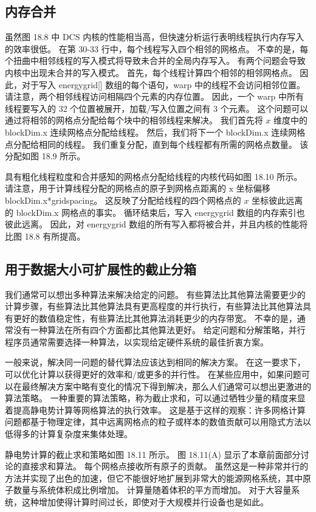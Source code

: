 \subsection{内存合并}
虽然图 18.8 中 DCS 内核的性能相当高，但快速分析运行表明线程执行内存写入的效率很低。 在第 30-33 行中，每个线程写入四个相邻的网格点。 不幸的是，每个扭曲中相邻线程的写入模式将导致未合并的全局内存写入。 有两个问题会导致内核中出现未合并的写入模式。 首先，每个线程计算四个相邻的相邻网格点。 因此，对于写入 energygrid[] 数组的每个语句，warp 中的线程不会访问相邻位置。 请注意，两个相邻线程访问相隔四个元素的内存位置。 因此，一个 warp 中所有线程要写入的 32 个位置被展开，加载/写入位置之间有 3 个元素。 这个问题可以通过将相邻的网格点分配给每个块中的相邻线程来解决。 我们首先将 $x$ 维度中的 blockDim.x 连续网格点分配给线程。 然后，我们将下一个 blockDim.x 连续网格点分配给相同的线程。 我们重复分配，直到每个线程都有所需的网格点数量。 该分配如图 18.9 所示。

具有粗化线程粒度和合并感知的网格点分配给线程的内核代码如图 18.10 所示。 请注意，用于计算线程分配的网格点的原子到网格点距离的 $\mathrm{x}$ 坐标偏移 blockDim.x*gridspacing。 这反映了分配给线程的四个网格点的 $x$ 坐标彼此远离的 blockDim.x 网格点的事实。 循环结束后，写入 energygrid 数组的内存索引也彼此远离。 因此，对 energygrid 数组的所有写入都将被合并，并且内核的性能将比图 18.8 有所提高。

\subsection{用于数据大小可扩展性的截止分箱}
我们通常可以想出多种算法来解决给定的问题。 有些算法比其他算法需要更少的计算步骤，有些算法比其他算法具有更高程度的并行执行，有些算法比其他算法具有更好的数值稳定性，有些算法比其他算法消耗更少的内存带宽。 不幸的是，通常没有一种算法在所有四个方面都比其他算法更好。 给定问题和分解策略，并行程序员通常需要选择一种算法，以实现给定硬件系统的最佳折衷方案。

一般来说，解决同一问题的替代算法应该达到相同的解决方案。 在这一要求下，可以优化计算以获得更好的效率和/或更多的并行性。 在某些应用中，如果问题可以在最终解决方案中略有变化的情况下得到解决，那么人们通常可以想出更激进的算法策略。 一种重要的算法策略，称为截止求和，可以通过牺牲少量的精度来显着提高静电势计算等网格算法的执行效率。 这是基于这样的观察：许多网格计算问题都基于物理定律，其中远离网格点的粒子或样本的数值贡献可以用隐式方法以低得多的计算复杂度来集体处理。

静电势计算的截止求和策略如图 18.11 所示。 图 18.11(A) 显示了本章前面部分讨论的直接求和算法。 每个网格点接收所有原子的贡献。 虽然这是一种非常并行的方法并实现了出色的加速，但它不能很好地扩展到非常大的能源网格系统，其中原子数量与系统体积成比例增加。 计算量随着体积的平方而增加。 对于大容量系统，这种增加使得计算时间过长，即使对于大规模并行设备也是如此。

